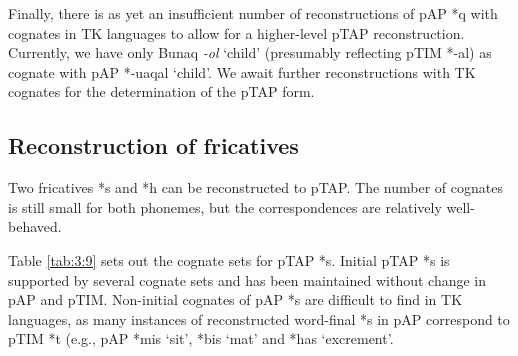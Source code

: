Finally, there is as yet an insufficient number of reconstructions of pAP *q with cognates in TK languages to allow for a higher-level pTAP reconstruction. Currently, we have only Bunaq \textit{{}-ol} `child' (presumably reflecting pTIM *-al) as cognate with pAP *-uaqal `child'. We await further reconstructions with TK cognates for the determination of the pTAP form.

\subsection{Reconstruction of fricatives}
Two fricatives *s and *h can be reconstructed to pTAP. The number of cognates is still small for both phonemes, but the correspondences are relatively well-behaved. 

Table \ref{tab:3:9} sets out the cognate sets for pTAP *s. Initial pTAP *s is supported by several cognate sets and has been maintained without change in pAP and pTIM. Non-initial cognates of pAP *s are difficult to find in TK languages, as many instances of reconstructed word-final *s in pAP correspond to pTIM *t (e.g., pAP *mis `sit', *bis `mat' and *has `excrement'.
 

